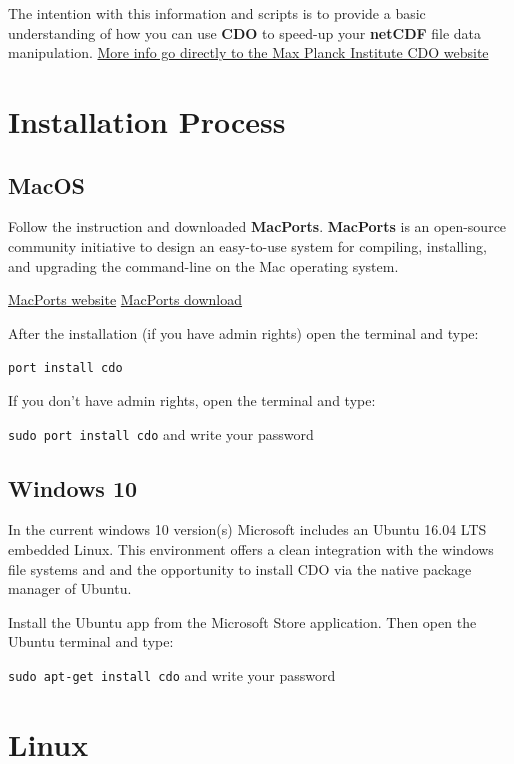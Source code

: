 \documentclass[]{book}
\begin{document}
The intention with this information and scripts is to provide a basic understanding of how you can use \textbf{CDO} to speed-up your \textbf{netCDF} file data manipulation. \href{https://code.mpimet.mpg.de/projects/cdo/}{More info go directly to the Max Planck Institute CDO website}

\hypertarget{installation-process}{%
\section{Installation Process}\label{installation-process}}

\hypertarget{macos}{%
\subsection{\texorpdfstring{\textbf{MacOS}}{MacOS}}\label{macos}}

Follow the instruction and downloaded \textbf{MacPorts}. \textbf{MacPorts} is an open-source community initiative to design an easy-to-use system for compiling, installing, and upgrading the command-line on the Mac operating system.

\href{https://www.macports.org/index.php}{MacPorts website}
\href{https://www.macports.org/install.php}{MacPorts download}

After the installation (if you have admin rights) open the terminal and type:

\texttt{port\ install\ cdo}

If you don't have admin rights, open the terminal and type:

\texttt{sudo\ port\ install\ cdo} and write your password

\hypertarget{windows-10}{%
\subsection{\texorpdfstring{\textbf{Windows 10}}{Windows 10}}\label{windows-10}}

In the current windows 10 version(s) Microsoft includes an Ubuntu 16.04 LTS embedded Linux. This environment offers a clean integration with the windows file systems and and the opportunity to install CDO via the native package manager of Ubuntu.

Install the Ubuntu app from the Microsoft Store application. Then open the Ubuntu terminal and type:

\texttt{sudo\ apt-get\ install\ cdo} and write your password

\hypertarget{linux}{%
\section{\texorpdfstring{\textbf{Linux}}{Linux}}\label{linux}}
\end{document}
